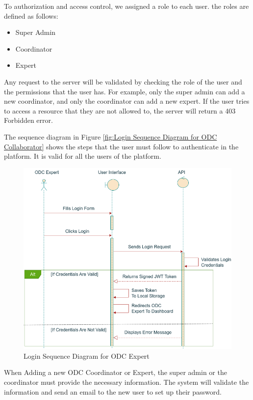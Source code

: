 To authorization and access control, we assigned a role to each user. the roles are defined as follows:
\begin{itemize}
    \item Super Admin
    \item Coordinator
    \item Expert
\end{itemize}

Any request to the server will be validated by checking the role of the user and the permissions that the user has.
For example, only the super admin can add a new coordinator, and only the coordinator can add a new expert.
If the user tries to access a resource that they are not allowed to, the server will return a 403 Forbidden error.

The sequence diagram in Figure \ref{fig:Login Sequence Diagram for ODC Collaborator} shows the steps that the user must follow to authenticate in the platform.
It is valid for all the users of the platform.

\begin{figure}
    \centering
    \includegraphics[width=1\textwidth]{images/sequenceODCExpertLogin.png}
    \caption{Login Sequence Diagram for ODC Expert}
    \label{fig:Login Sequence Diagram for ODC Expert}
\end{figure}

When Adding a new ODC Coordinator or Expert, the super admin or the coordinator must provide the necessary information.
The system will validate the information and send an email to the new user to set up their password.

